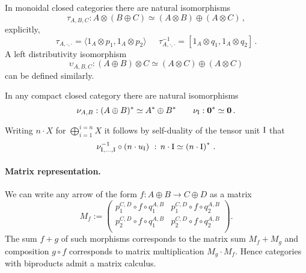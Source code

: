 \documentclass[10pt]{article}
\begin{document}
%

\begin{proposition}\label{distributivity}
In monoidal closed categories there are natural isomorphisms 
\[
\tau_{A,B,C}:A\otimes(B\oplus C)\simeq (A\otimes B)\oplus(A\otimes C)\,,
\]
explicitly,
\[
\tau_{A,\cdot,\cdot}\!\!=\langle 1_A\otimes p_1,1_A\otimes p_2\rangle\quad\ \ 
\tau_{A,\cdot,\cdot}^{-1}\!\!=[ 1_A\otimes q_1,1_A\otimes q_2]\,.
\]
A left distributivity isomorphism 
\[ \upsilon_{A, B, C} : (A \oplus B) \otimes C
\simeq (A \otimes C) \oplus (A \otimes C) \]
can be defined similarly.
\end{proposition}

\begin{proposition}
In any compact closed category there are natural isomorphisms
\[
\nu_{A,B}:(A\oplus B)^*\simeq A^*\oplus B^*\qquad
\nu_{\rm I}:\mathbf{0}^*\simeq\mathbf{0}\,.
\]
\end{proposition}
Writing $n\cdot X$ for $\bigoplus_{i=1}^{i=n}X$ it follows by
self-duality of the tensor unit
${\rm I}$ that
\[ 
\nu^{-1}_{{\rm I},\ldots,{\rm
I}}\circ\left(n\cdot{u}_{\rm
I}\right)\ :\,n\cdot{\rm I}\simeq\left(n\cdot{\rm
I}\right)^{*}\,.
\]

\paragraph{Matrix representation.} 
We can write any arrow of the form
$f:A\oplus B\to C\oplus D$ as a matrix
\[
M_f:=
\left(
\begin{array}{cc}
p_1^{C,D}\!\!\circ f\circ q_1^{A,B} & p_1^{C,D}\circ f\circ q_2^{A,B}\\
p_2^{C,D}\circ f\circ q_1^{A,B} & p_2^{C,D}\circ f\circ q_2^{A,B}\\
\end{array}
\right).
\]
The sum $f+g$ of such morphisms corresponds to the matrix sum $M_f+M_g$ and composition $g\circ f$ corresponds to matrix
multiplication $M_g\cdot M_f$. Hence  categories with biproducts admit a matrix
calculus.
 
\end{document}
